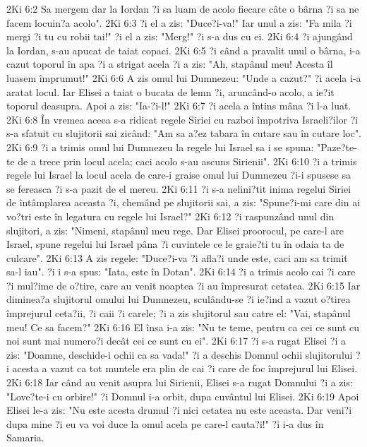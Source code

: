2Ki 6:2  Sa mergem dar la Iordan ?i sa luam de acolo fiecare câte o bârna ?i sa ne facem locuin?a acolo".
2Ki 6:3  ?i el a zis: "Duce?i-va!" Iar unul a zis: "Fa mila ?i mergi ?i tu cu robii tai!" ?i el a zis: "Merg!" ?i s-a dus cu ei.
2Ki 6:4  ?i ajungând la Iordan, s-au apucat de taiat copaci.
2Ki 6:5  ?i când a pravalit unul o bârna, i-a cazut toporul în apa ?i a strigat acela ?i a zis: "Ah, stapânul meu! Acesta îl luasem împrumut!"
2Ki 6:6  A zis omul lui Dumnezeu: "Unde a cazut?" ?i acela i-a aratat locul. Iar Elisei a taiat o bucata de lemn ?i, aruncând-o acolo, a ie?it toporul deasupra. Apoi a zis: "Ia-?i-l!"
2Ki 6:7  ?i acela a întins mâna ?i l-a luat.
2Ki 6:8  În vremea aceea s-a ridicat regele Siriei cu razboi împotriva Israeli?ilor ?i s-a sfatuit cu slujitorii sai zicând: "Am sa a?ez tabara în cutare sau în cutare loc".
2Ki 6:9  ?i a trimis omul lui Dumnezeu la regele lui Israel sa i se spuna: "Paze?te-te de a trece prin locul acela; caci acolo s-au ascuns Sirienii".
2Ki 6:10  ?i a trimis regele lui Israel la locul acela de care-i graise omul lui Dumnezeu ?i-i spusese sa se fereasca ?i s-a pazit de el mereu.
2Ki 6:11  ?i s-a nelini?tit inima regelui Siriei de întâmplarea aceasta ?i, chemând pe slujitorii sai, a zis: "Spune?i-mi care din ai vo?tri este în legatura cu regele lui Israel?"
2Ki 6:12  ?i raspunzând unul din slujitori, a zis: "Nimeni, stapânul meu rege. Dar Elisei proorocul, pe care-l are Israel, spune regelui lui Israel pâna ?i cuvintele ce le graie?ti tu în odaia ta de culcare".
2Ki 6:13  A zis regele: "Duce?i-va ?i afla?i unde este, caci am sa trimit sa-l iau". ?i i s-a spus: "Iata, este în Dotan".
2Ki 6:14  ?i a trimis acolo cai ?i care ?i mul?ime de o?tire, care au venit noaptea ?i au împresurat cetatea.
2Ki 6:15  Iar diminea?a slujitorul omului lui Dumnezeu, sculându-se ?i ie?ind a vazut o?tirea împrejurul ceta?ii, ?i caii ?i carele; ?i a zis slujitorul sau catre el: "Vai, stapânul meu! Ce sa facem?"
2Ki 6:16  El însa i-a zis: "Nu te teme, pentru ca cei ce sunt cu noi sunt mai numero?i decât cei ce sunt cu ei".
2Ki 6:17  ?i s-a rugat Elisei ?i a zis: "Doamne, deschide-i ochii ca sa vada!" ?i a deschis Domnul ochii slujitorului ?i acesta a vazut ca tot muntele era plin de cai ?i care de foc împrejurul lui Elisei.
2Ki 6:18  Iar când au venit asupra lui Sirienii, Elisei s-a rugat Domnului ?i a zis: "Love?te-i cu orbire!" ?i Domnul i-a orbit, dupa cuvântul lui Elisei.
2Ki 6:19  Apoi Elisei le-a zis: "Nu este acesta drumul ?i nici cetatea nu este aceasta. Dar veni?i dupa mine ?i eu va voi duce la omul acela pe care-l cauta?i!" ?i i-a dus în Samaria.
